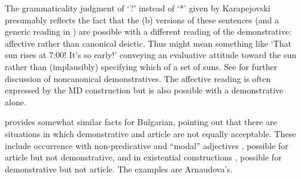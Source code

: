 \documentclass[output=paper,
colorlinks,
citecolor=brown,
newtxmath
]{langscibook}
\begin{document}
\ea \label{prof}
\z\z

\noindent The grammaticality judgment of `?' instead of `*' given by Karapejovski presumably reflects the fact that the (b) versions of these sentences (and a generic reading in ) are possible with a different reading of the demonstrative: affective rather than canonical deictic. Thus  might mean something like `That sun rises at 7:00! It's so early!' conveying an evaluative attitude toward the sun rather than (implausibly) specifying which of a set of suns. See  for further discussion of noncanonical demonstratives. The affective reading is often expressed by the MD construction but is also possible with a demonstrative alone.

\cite{Arnaudova1998} provides somewhat similar facts for Bulgarian, pointing out that there are situations in which demonstrative and article are not equally acceptable. These include occurrence with non-predicative and ``modal'' adjectives , possible for article but not demonstrative, and in existential constructions , possible for demonstrative but not article. The examples are Arnaudova's.



\ea \label{bother}
\z
\z
\end{document}
